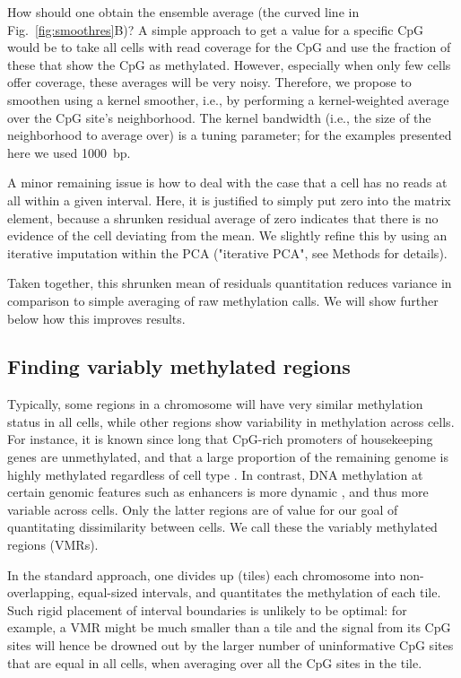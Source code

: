 \documentclass[10pt]{article}
\begin{document}
How should one obtain the ensemble average (the curved line in Fig.~\ref{fig:smoothres}B)?
A simple approach to get a value for a specific CpG would be to take all cells with read coverage for the CpG and use the fraction of these that show the CpG as methylated.
However, especially when only few cells offer coverage, these averages will be very noisy.
Therefore, we propose to smoothen using a kernel smoother, i.e., by performing a kernel-weighted average over the CpG site's neighborhood.
The kernel bandwidth (i.e., the size of the neighborhood to average over) is a tuning parameter; for the examples presented here we used 1000~bp.

A minor remaining issue is how to deal with the case that a cell has no reads at all within a given interval.
Here, it is justified to simply put zero into the matrix element, because a shrunken residual average of zero indicates that there is no evidence of the cell deviating from the mean.
We slightly refine this by using an iterative imputation within the PCA ("iterative PCA", see Methods for details).

Taken together, this shrunken mean of residuals quantitation reduces variance in comparison to simple averaging of raw methylation calls.
We will show further below how this improves results.

\subsection*{Finding variably methylated regions}


Typically, some regions in a chromosome will have very similar methylation status in all cells, while other regions show variability in methylation across cells.
For instance, it is known  since long that CpG-rich promoters of housekeeping genes are unmethylated, and that a large proportion of the remaining genome is highly methylated regardless of cell type \citep{bird1986cpg}.
In contrast, DNA methylation at certain genomic features such as enhancers is more dynamic \citep{argelaguet2019gastru}, and thus more variable across cells.
Only the latter regions are of value for our goal of quantitating dissimilarity between cells.
We call these the variably methylated regions (VMRs).

In the standard approach, one divides up (tiles) each chromosome into non-overlapping, equal-sized intervals, and quantitates the methylation of each tile.
Such rigid placement of interval boundaries is unlikely to be optimal: for example, a VMR might be much smaller than a tile and the signal from its CpG sites will hence be drowned out by the larger number of uninformative CpG sites that are equal in all cells, when averaging over all the CpG sites in the tile.
\end{document}
